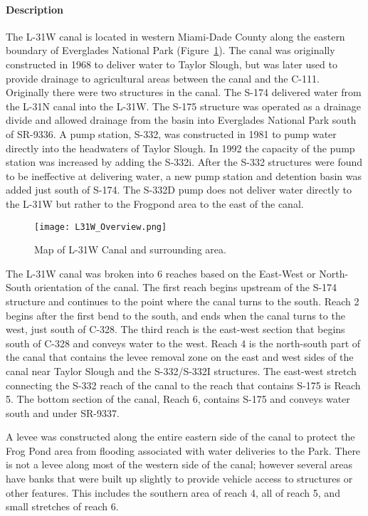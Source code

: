 \paragraph{Description}
The L-31W canal is located in western Miami-Dade County along the eastern boundary of Everglades National Park (Figure~\ref{fig:L31W_Overview}).  The canal was originally constructed in 1968 to deliver water to Taylor Slough, but was later used to provide drainage to agricultural areas between the canal and the C-111.  Originally there were two structures in the canal. The S-174 delivered water from the L-31N canal into the L-31W.  The S-175 structure was operated as a drainage divide and allowed drainage from the basin into Everglades National Park south of SR-9336.  A pump station, S-332, was constructed in 1981 to pump water directly into the headwaters of Taylor Slough.  In 1992 the capacity of the pump station was increased by adding the S-332i.  After the S-332 structures were found to be ineffective at delivering water, a new pump station and detention basin was added just south of S-174.  The S-332D pump does not deliver water directly to the L-31W but rather to the Frogpond area to the east of the canal.

\begin{figure}[!h]
  \begin{center}
  \texttt{[image: L31W\_Overview.png]}
  \caption[Map of L-31W Canal and surrounding area.]{Map of L-31W Canal and surrounding area.}
  \label{fig:L31W_Overview}
  \end{center}
\end{figure}

The L-31W canal was broken into 6 reaches based on the East-West or North-South orientation of the canal.  The first reach begins upstream of the S-174 structure and continues to the point where the canal turns to the south.  Reach 2 begins after the first bend to the south, and ends when the canal turns to the west, just south of C-328.  The third reach is the east-west section that begins south of C-328 and conveys water to the west.  Reach 4 is the north-south part of the canal that contains the levee removal zone on the east and west sides of the canal near Taylor Slough and the S-332/S-332I structures.  The east-west stretch connecting the S-332 reach of the canal to the reach that contains S-175 is Reach 5.  The bottom section of the canal, Reach 6, contains S-175 and conveys water south and under SR-9337.

A levee was constructed along the entire eastern side of the canal to protect the Frog Pond area from flooding associated with water deliveries to the Park.  There is not a levee along most of the western side of the canal; however several areas have banks that were built up slightly to provide vehicle access to structures or other features.  This includes the southern area of reach 4, all of reach 5, and small stretches of reach 6.

